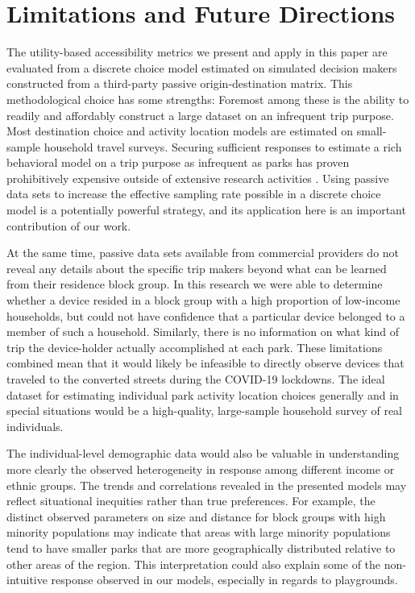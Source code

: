 \documentclass[3p, authoryear, review]{elsarticle} %
\begin{document}
\hypertarget{limitations}{%
\section{Limitations and Future Directions}\label{limitations}}

The utility-based accessibility metrics we present and apply in this paper are
evaluated from a discrete choice model estimated on simulated decision makers
constructed from a third-party passive origin-destination matrix. This
methodological choice has some strengths: Foremost among these is the ability to
readily and affordably construct a large dataset on an infrequent trip purpose.
Most destination choice and activity location models are estimated on
small-sample household travel surveys. Securing sufficient responses to estimate
a rich behavioral model on a trip purpose as infrequent as parks has proven
prohibitively expensive outside of extensive research activities \citep[e.g.,][]{Kaczynski2016}. Using passive data sets to increase the effective sampling rate
possible in a discrete choice model is a potentially powerful strategy, and its
application here is an important contribution of our work.

At the same time, passive data sets available from commercial providers do not
reveal any details about the specific trip makers beyond what can be learned
from their residence block group. In this research we were able to determine
whether a device resided in a block group with a high proportion of low-income
households, but could not have confidence that a particular device belonged to a
member of such a household. Similarly, there is no information on what kind of
trip the device-holder actually accomplished at each park. These limitations
combined mean that it would likely be infeasible to directly observe devices
that traveled to the converted streets during the COVID-19 lockdowns. The ideal
dataset for estimating individual park activity location choices generally and
in special situations would be a high-quality, large-sample household survey of
real individuals.

The individual-level demographic data would also be valuable in understanding
more clearly the observed heterogeneity in response among different income or
ethnic groups. The trends and correlations revealed in the presented models may
reflect situational inequities rather than true preferences. For example, the
distinct observed parameters on size and distance for block groups with high
minority populations may indicate that areas with large minority populations
tend to have smaller parks that are more geographically distributed relative to
other areas of the region. This interpretation could also explain some of the
non-intuitive response observed in our models, especially in regards to
playgrounds.
\end{document}
